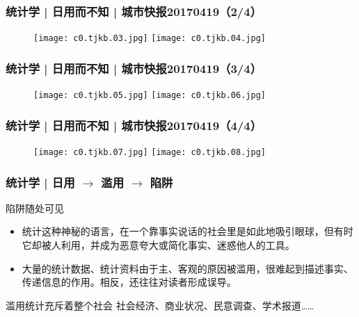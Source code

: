 \begin{frame}
  \frametitle{统计学 | 日用而不知 | 城市快报20170419（2/4）}
  \begin{figure}
    \centering
    \texttt{[image: c0.tjkb.03.jpg]}\quad
    \texttt{[image: c0.tjkb.04.jpg]}
  \end{figure}
\end{frame}

\begin{frame}
  \frametitle{统计学 | 日用而不知 | 城市快报20170419（3/4）}
  \begin{figure}
    \centering
    \texttt{[image: c0.tjkb.05.jpg]}\quad
    \texttt{[image: c0.tjkb.06.jpg]}
  \end{figure}
\end{frame}

\begin{frame}
  \frametitle{统计学 | 日用而不知 | 城市快报20170419（4/4）}
  \begin{figure}
    \centering
    \texttt{[image: c0.tjkb.07.jpg]}\quad
    \texttt{[image: c0.tjkb.08.jpg]}
  \end{figure}
\end{frame}

\begin{frame}
  \frametitle{统计学 | 日用 $\rightarrow$ 滥用 $\rightarrow$ 陷阱}
  \begin{block}{陷阱随处可见}
    \begin{itemize}
      \item 统计这种神秘的语言，在一个靠事实说话的社会里是如此地吸引眼球，但有时它却被人利用，并成为恶意夸大或简化事实、迷惑他人的工具。
      \item 大量的统计数据、统计资料由于主、客观的原因被滥用，很难起到描述事实、传递信息的作用。相反，还往往对读者形成误导。
    \end{itemize}
  \end{block}
  \pause
  \begin{block}{滥用统计充斥着整个社会}
    社会经济、商业状况、民意调查、学术报道……
  \end{block}
\end{frame}

